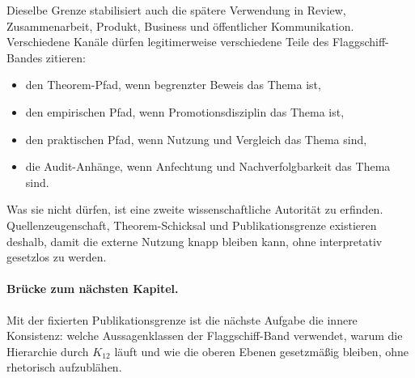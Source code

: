 Dieselbe Grenze stabilisiert auch die spätere Verwendung in Review,
Zusammenarbeit, Produkt, Business und öffentlicher Kommunikation.
Verschiedene Kanäle dürfen legitimerweise verschiedene Teile des
Flaggschiff-Bandes zitieren:

\begin{itemize}
\item den Theorem-Pfad, wenn begrenzter Beweis das Thema ist,
\item den empirischen Pfad, wenn Promotionsdisziplin das Thema ist,
\item den praktischen Pfad, wenn Nutzung und Vergleich das Thema sind,
\item die Audit-Anhänge, wenn Anfechtung und Nachverfolgbarkeit das Thema sind.
\end{itemize}

Was sie nicht dürfen, ist eine zweite wissenschaftliche Autorität zu erfinden.
Quellenzeugenschaft, Theorem-Schicksal und Publikationsgrenze existieren
deshalb, damit die externe Nutzung knapp bleiben kann, ohne interpretativ
gesetzlos zu werden.

\paragraph{Brücke zum nächsten Kapitel.}
Mit der fixierten Publikationsgrenze ist die nächste Aufgabe die innere
Konsistenz: welche Aussagenklassen der Flaggschiff-Band verwendet, warum die
Hierarchie durch \(K_{12}\) läuft und wie die oberen Ebenen gesetzmäßig
bleiben, ohne rhetorisch aufzublähen.

\clearpage
